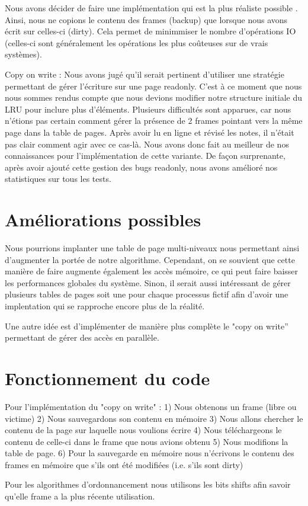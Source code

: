 \documentclass{article}
\begin{document}
\par
Nous avons décider de faire une implémentation qui est la plus réaliste possible . Ainsi, nous ne copions le contenu des frames (backup) que lorsque nous avons écrit sur celles-ci (dirty). Cela permet de minimmiser le nombre d’opérations IO (celles-ci sont généralement les opérations les plus coûteuses sur de vrais systèmes). 

\par
Copy on write : Nous avons jugé qu'il serait pertinent d'utiliser une stratégie permettant de gérer l’écriture sur une page readonly. C’est à ce moment que nous nous sommes rendus compte que nous devions modifier notre structure initiale du LRU pour inclure plus d’éléments. Plusieurs difficultés sont apparues, car nous n’étions pas certain comment gérer la présence de 2 frames pointant vers la même page dans la table de pages. Après avoir lu en ligne et révisé les notes, il n’était pas clair comment agir avec ce cas-là. Nous avons donc fait au meilleur de nos connaissances pour l’implémentation de cette variante. De façon surprenante, après avoir ajouté cette gestion des bugs readonly, nous avons amélioré nos statistiques sur tous les tests.



\section{Améliorations possibles}
Nous pourrions implanter une table de page multi-niveaux nous permettant ainsi d’augmenter la portée de notre algorithme. Cependant, on se souvient que cette manière de faire augmente également les accès mémoire, ce qui peut faire baisser les performances globales du système. Sinon, il serait aussi intéressant de gérer plusieurs tables de pages soit une pour chaque processus fictif afin d'avoir une implentation qui se rapproche encore plus de la réalité.

Une autre idée est d’implémenter de manière plus complète le "copy on write” permettant de gérer des accès en parallèle.

\section{Fonctionnement du code}

Pour l'implémentation du "copy on write" :
1) Nous obtenons un frame (libre ou victime)
2) Nous sauvegardons son contenu en mémoire
3) Nous allons chercher le contenu de la page sur laquelle nous voulions écrire 
4) Nous téléchargeons le contenu de celle-ci dans le frame que nous avions obtenu
5) Nous modifions la table de page. 
6) Pour la sauvegarde en mémoire nous n'écrivons le contenu des frames en mémoire que s'ils ont été modifiées (i.e. s’ils sont dirty)

\par 
Pour les algorithmes d'ordonnancement nous utilisons les bits shifts afin savoir qu'elle frame a la plus récente utilisation.
\end{document}
